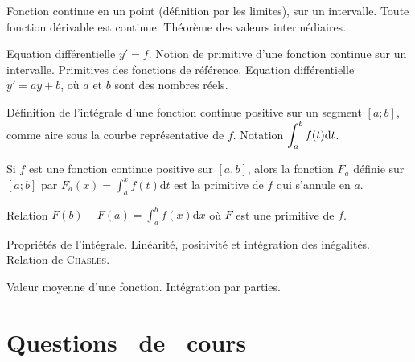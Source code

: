 \documentclass[a4paper,french,bookmarks]{book}
\renewcommand{\questionsdecours}{\section*{\centering\EBGaramond\Large Questions~ de~ cours}}
\begin{document}
    \begin{enumerate}
        \ithand Fonction continue en un point (définition par les limites), sur un intervalle. Toute fonction dérivable est continue. Théorème des valeurs intermédiaires.
        
        \ithand Equation différentielle $y' = f$. Notion de primitive d'une fonction continue sur un intervalle. Primitives des fonctions de référence. Equation différentielle $y' = ay + b$, où $a$ et $b$ sont des nombres réels.
        
        \ithand Définition de l'intégrale d'une fonction continue positive sur un segment $[a; b]$, comme aire sous la courbe représentative de $f$. Notation $\displaystyle\int_a^b f(t)\mathrm d t$.
        
        \ithand Si $f$ est une fonction continue positive sur $[a, b]$, alors la fonction $F_a$ définie sur $[a; b]$ par $F_a(x) = \displaystyle \int_a^x f(t)\textrm{d}t$ est la primitive de $f$ qui s'annule en $a$.
        
        \ithand Relation $F(b) - F(a) = \displaystyle\int_a^b f(x)\textrm{d}x$ où $F$ est une primitive de $f$.
        
        \ithand Propriétés de l'intégrale. Linéarité, positivité et intégration des inégalités. Relation de \textsc{Chasles}.
        
        \ithand Valeur moyenne d'une fonction. Intégration par parties.
    \end{enumerate}
    
    \questionsdecours
    
\end{document}
